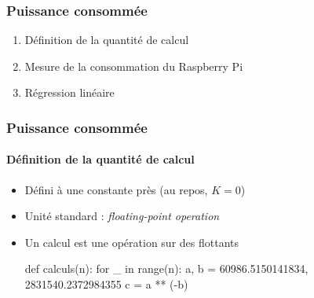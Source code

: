 \documentclass[a4paper,11pt]{beamer}
\begin{document}
\begin{frame}
    \frametitle{Puissance consommée}

    \begin{enumerate}
        \item Définition de la quantité de calcul
        \item Mesure de la consommation du Raspberry Pi
        \item Régression linéaire
    \end{enumerate}
\end{frame}

\begin{frame}[fragile]
    \frametitle{Puissance consommée}
    \framesubtitle{Définition de la quantité de calcul}

    \begin{itemize}
        \item Défini à une constante près (au repos, $K = 0$)
        \item Unité standard : \textit{floating-point operation}
        \item Un calcul est une opération sur des flottants
        \begin{python}
def calculs(n):
    for _ in range(n):
        a, b = 60986.5150141834, 2831540.2372984355
        c = a ** (-b)
        \end{python}
    \end{itemize}
\end{frame}
\end{document}
